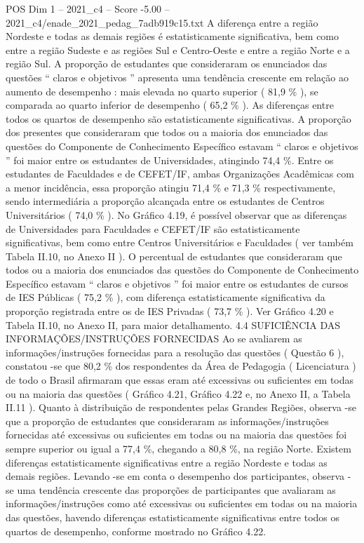 \begin{textsample}{POS Dim 1 – 2021\_c4 – Score -5.00 – 2021\_c4/enade\_2021\_pedag\_7adb919c15.txt}
A diferença entre a região Nordeste e todas as demais regiões é estatisticamente significativa, bem como entre a região Sudeste e as regiões Sul e Centro-Oeste e entre a região Norte e a região Sul.
A proporção de estudantes que consideraram os enunciados das questões “ claros e objetivos ” apresenta uma tendência crescente em relação ao aumento de desempenho : mais elevada no quarto superior ( 81,9 \% ), se comparada ao quarto inferior de desempenho ( 65,2 \% ).
As diferenças entre todos os quartos de desempenho são estatisticamente significativas.
A proporção dos presentes que consideraram que todos ou a maioria dos enunciados das questões do Componente de Conhecimento Específico estavam “ claros e objetivos ” foi maior entre os estudantes de Universidades, atingindo 74,4 \%.
Entre os estudantes de Faculdades e de CEFET/IF, ambas Organizações Acadêmicas com a menor incidência, essa proporção atingiu 71,4 \% e 71,3 \% respectivamente, sendo intermediária a proporção alcançada entre os estudantes de Centros Universitários ( 74,0 \% ).
No Gráfico 4.19, é possível observar que as diferenças de Universidades para Faculdades e CEFET/IF são estatisticamente significativas, bem como entre Centros Universitários e Faculdades ( ver também Tabela II.10, no Anexo II ).
O percentual de estudantes que consideraram que todos ou a maioria dos enunciados das questões do Componente de Conhecimento Específico estavam “ claros e objetivos ” foi maior entre os estudantes de cursos de IES Públicas ( 75,2 \% ), com diferença estatisticamente significativa da proporção registrada entre os de IES Privadas ( 73,7 \% ).
Ver Gráfico 4.20 e Tabela II.10, no Anexo II, para maior detalhamento. 4.4 SUFICIÊNCIA DAS INFORMAÇÕES/INSTRUÇÕES FORNECIDAS Ao se avaliarem as informações/instruções fornecidas para a resolução das questões ( Questão 6 ), constatou -se que 80,2 \% dos respondentes da Área de Pedagogia ( Licenciatura ) de todo o Brasil afirmaram que essas eram até excessivas ou suficientes em todas ou na maioria das questões ( Gráfico 4.21, Gráfico 4.22 e, no Anexo II, a Tabela II.11 ).
Quanto à distribuição de respondentes pelas Grandes Regiões, observa -se que a proporção de estudantes que consideraram as informações/instruções fornecidas até excessivas ou suficientes em todas ou na maioria das questões foi sempre superior ou igual a 77,4 \%, chegando a 80,8 \%, na região Norte.
Existem diferenças estatisticamente significativas entre a região Nordeste e todas as demais regiões.
Levando -se em conta o desempenho dos participantes, observa -se uma tendência crescente das proporções de participantes que avaliaram as informações/instruções como até excessivas ou suficientes em todas ou na maioria das questões, havendo diferenças estatisticamente significativas entre todos os quartos de desempenho, conforme mostrado no Gráfico 4.22.

\end{textsample}
